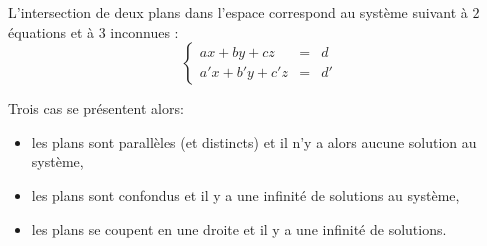\documentclass[class=report,crop=false]{standalone}
\begin{document}
L'intersection de deux plans dans l'espace correspond au système suivant
à $2$ équations et à $3$ inconnues :
$$\left\{\begin{array}{rcl}
a x + b y + c z    & = & d \\
a' x + b' y + c' z & = & d'
\end{array}\right.$$

Trois cas se présentent alors:
\begin{itemize}
\item les plans sont parallèles (et distincts) et il n'y a alors aucune solution au système,
\item les plans sont confondus et il y a une infinité de solutions au système,
\item les plans se coupent en une droite et il y a une infinité de solutions.
\end{itemize}
\end{document}
